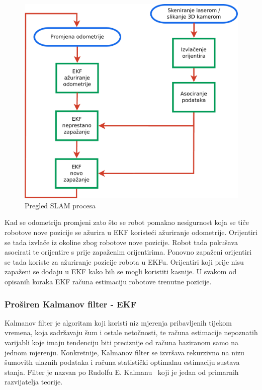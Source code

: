 
\begin{figure}[h]
\renewcommand{\figurename}{Grafikon}
\centering
\includegraphics[scale=0.43]{figures/slam-overview.pdf}
\caption{Pregled SLAM procesa}
\label{fig:slam-overview.pdf}
\end{figure}

Kad se odometrija promjeni zato što se robot pomakao nesigurnost koja se
tiče robotove nove pozicije se ažurira u EKF koristeći ažuriranje
odometrije. Orijentiri se tada izvlače iz okoline zbog robotove nove
pozicije. Robot tada pokušava asocirati te orijentire s prije zapaženim
orijentirima. Ponovno zapaženi orijentiri se tada koriste za ažuriranje
pozicije robota u EKFu. Orijentiri koji prije nisu zapaženi se dodaju u
EKF kako bih se mogli koristiti kasnije. U svakom od opisanih koraka EKF
računa estimaciju robotove trenutne pozicije. 

\subsubsection{Proširen Kalmanov filter - EKF} %
\label{ssub:Proširen Kalmanov filter - EKF}

Kalmanov filter je algoritam koji koristi niz mjerenja pribavljenih
tijekom vremena, koja sadržavaju šum i ostale netočnosti, te računa
estimacije nepoznatih varijabli koje imaju tendenciju biti preciznije od
računa baziranom samo na jednom mjerenju. Konkretnije, Kalmanov filter
se izvršava rekurzivno na nizu šumovith ulaznih podataka i računa
statistički optimalnu estimaciju sustava stanja. Filter je nazvan po
Rudolfu E. Kalmanu~\cite{Kalman} koji je jedan od primarnih
razvijatelja teorije.


